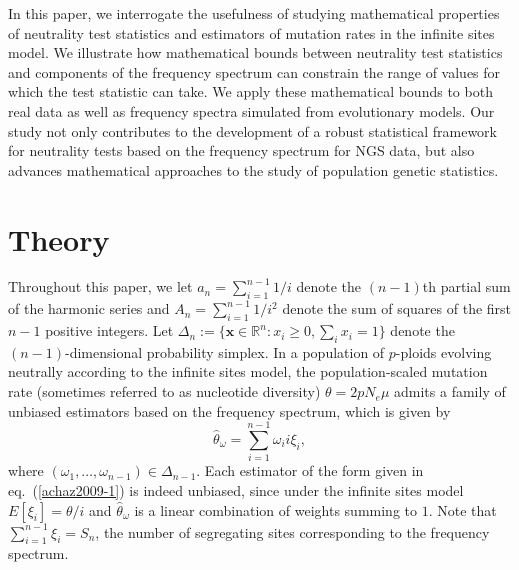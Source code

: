 \documentclass[lettersize, 10pt]{article}
\begin{document}
In this paper, we interrogate the usefulness of studying mathematical properties of neutrality test statistics and estimators of mutation rates in the infinite sites model. We illustrate how mathematical bounds between neutrality test statistics and components of the frequency spectrum can constrain the range of values for which the test statistic can take. We apply these mathematical bounds to both real data as well as frequency spectra simulated from evolutionary models. Our study not only contributes to the development of a robust statistical framework for neutrality tests based on the frequency spectrum for NGS data, but also advances mathematical approaches to the study of population genetic statistics. 

\section*{Theory}

Throughout this paper, we let $a_n=\sum_{i=1}^{n-1} 1/i$ denote the $(n-1)$th partial sum of the harmonic series and $A_n=\sum_{i=1}^{n-1} 1/i^2$ denote the sum of squares of the first $n-1$ positive integers. Let $\Delta_n:=\{\mathbf{x}\in\mathbb{R}^{n}:x_i\geqslant 0, \sum_{i} x_i=1\}$ denote the $(n-1)$-dimensional probability simplex. In a population of $p$-ploids evolving neutrally according to the infinite sites model, the population-scaled mutation rate (sometimes referred to as nucleotide diversity) $\theta=2pN_e\mu$ admits a family of unbiased estimators based on the frequency spectrum, which is given by
\begin{equation}
\hat{\theta}_\omega = \sum_{i=1}^{n-1}\omega_i i\xi_i, \label{achaz2009-1}
\end{equation}
where $(\omega_1,\ldots,\omega_{n-1})\in \Delta_{n-1}$. Each estimator of the form given in eq.~(\ref{achaz2009-1}) is indeed unbiased, since under the infinite sites model $E[\xi_i] = \theta/i$ and $\hat{\theta}_\omega$ is a linear combination of weights summing to $1$. Note that $\sum_{i=1}^{n-1}\xi_i=S_n$, the number of segregating sites corresponding to the frequency spectrum. 
\end{document}
